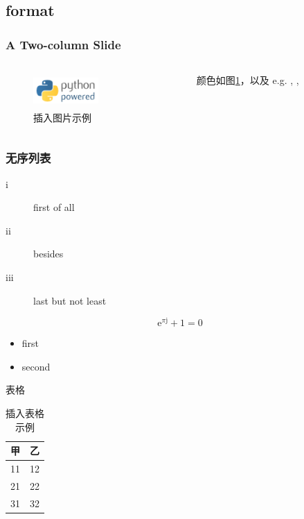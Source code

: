 \documentclass[UTF8]{beamer}
\begin{document}
\subsection{format}
\begin{frame}
\frametitle{A Two-column Slide}
\begin{columns} 
\begin{column}{0.5\textwidth} 
\begin{figure}[htb]
	\includegraphics[width=2.5cm,height=1.3cm]{test.png}
	\caption{插入图片示例}
	\label{fig1}
    \end{figure}
\end{column}
\begin{column}{0.5\textwidth} 
颜色如图\ref{fig1}，以及 e.g. {\color{red}{red}}, {\color{orange}{orange}}, {\color{blue}{blue}}
\vspace{9.5em}
\end{column}
\end{columns}
\end{frame}

\begin{frame}
    \frametitle{无序列表}
    \begin{description}
        \item[i] first of all
        \item[ii] besides
        \item[iii] last but not least
    \end{description}
    \begin{equation}
        \text{e}^{\pi \text{j}} + 1 = 0
    \end{equation}
    \begin{itemize}
        \item first
        \item second
    \end{itemize}
\end{frame}

\begin{frame}{表格}
\begin{table}[!hbp]
\centering
\begin{tabular}{c|c}
	\hline
	甲 &乙\\
	\hline
	11 & 12\\
	21 & 22\\
	31 & 32\\
	\hline
\end{tabular}
\caption{插入表格示例}
\label{tab1}
\end{table}
\end{frame}
\end{document}
